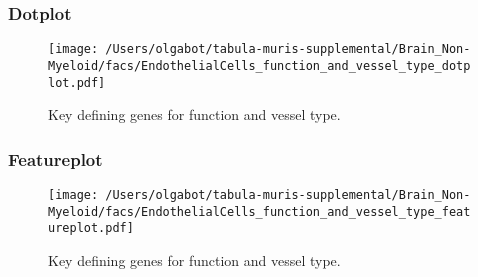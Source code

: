 \clearpage

\subsubsection{Dotplot}
\begin{figure}[h]
\centering
\texttt{[image: /Users/olgabot/tabula-muris-supplemental/Brain\_Non-Myeloid/facs/EndothelialCells\_function\_and\_vessel\_type\_dotplot.pdf]}

\caption{Key defining genes for function and vessel type.
}
\end{figure}


\clearpage

\subsubsection{Featureplot}
\begin{figure}[h]
\centering
\texttt{[image: /Users/olgabot/tabula-muris-supplemental/Brain\_Non-Myeloid/facs/EndothelialCells\_function\_and\_vessel\_type\_featureplot.pdf]}

\caption{Key defining genes for function and vessel type.
}
\end{figure}

